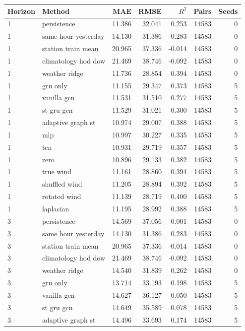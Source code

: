 \begin{tabular}{llrrrrr}\hline
Horizon & Method & MAE & RMSE & $R^2$ & Pairs & Seeds \\\hline
1 & persistence & 11.386 & 32.041 & 0.253 & 14583 & 0 \\
1 & same hour yesterday & 14.130 & 31.386 & 0.283 & 14583 & 0 \\
1 & station train mean & 20.965 & 37.336 & -0.014 & 14583 & 0 \\
1 & climatology hod dow & 21.469 & 38.746 & -0.092 & 14583 & 0 \\
1 & weather ridge & 11.736 & 28.854 & 0.394 & 14583 & 0 \\
1 & gru only & 11.155 & 29.347 & 0.373 & 14583 & 5 \\
1 & vanilla gcn & 11.531 & 31.510 & 0.277 & 14583 & 5 \\
1 & st gru gcn & 11.529 & 31.021 & 0.300 & 14583 & 5 \\
1 & adaptive graph st & 10.974 & 29.007 & 0.388 & 14583 & 5 \\
1 & mlp & 10.997 & 30.227 & 0.335 & 14583 & 5 \\
1 & tcn & 10.931 & 29.719 & 0.357 & 14583 & 5 \\
1 & zero & 10.896 & 29.133 & 0.382 & 14583 & 5 \\
1 & true wind & 11.161 & 28.860 & 0.394 & 14583 & 5 \\
1 & shuffled wind & 11.205 & 28.894 & 0.392 & 14583 & 5 \\
1 & rotated wind & 11.139 & 28.719 & 0.400 & 14583 & 5 \\
1 & laplacian & 11.195 & 28.992 & 0.388 & 14583 & 5 \\
3 & persistence & 14.569 & 37.056 & 0.001 & 14583 & 0 \\
3 & same hour yesterday & 14.130 & 31.386 & 0.283 & 14583 & 0 \\
3 & station train mean & 20.965 & 37.336 & -0.014 & 14583 & 0 \\
3 & climatology hod dow & 21.469 & 38.746 & -0.092 & 14583 & 0 \\
3 & weather ridge & 14.540 & 31.839 & 0.262 & 14583 & 0 \\
3 & gru only & 13.714 & 33.193 & 0.198 & 14583 & 5 \\
3 & vanilla gcn & 14.627 & 36.127 & 0.050 & 14583 & 5 \\
3 & st gru gcn & 14.649 & 35.589 & 0.078 & 14583 & 5 \\
3 & adaptive graph st & 14.496 & 33.693 & 0.174 & 14583 & 5 \\

\end{tabular}
